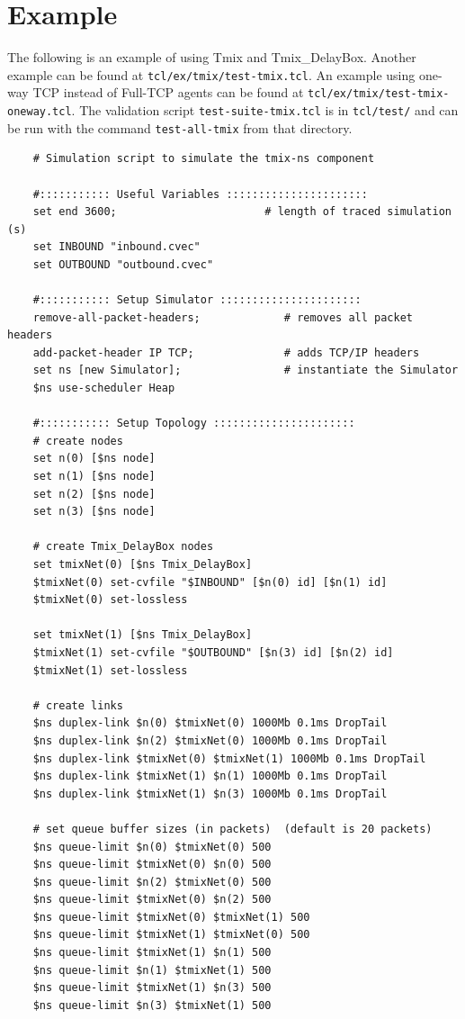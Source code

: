 \section{Example}
The following is an example of using Tmix and Tmix\_DelayBox.  Another example can be found at {\tt tcl/ex/tmix/test-tmix.tcl}.  An example using one-way TCP instead of Full-TCP agents can be found at {\tt tcl/ex/tmix/test-tmix-oneway.tcl}.  The
validation script {\tt test-suite-tmix.tcl} is in {\tt tcl/test/} and
can be run with the command {\tt test-all-tmix} from that directory.

\begin{verbatim}
	# Simulation script to simulate the tmix-ns component

	#::::::::::: Useful Variables ::::::::::::::::::::::
	set end 3600;                       # length of traced simulation (s)
	set INBOUND "inbound.cvec"
	set OUTBOUND "outbound.cvec"

	#::::::::::: Setup Simulator ::::::::::::::::::::::
	remove-all-packet-headers;             # removes all packet headers
	add-packet-header IP TCP;              # adds TCP/IP headers
	set ns [new Simulator];                # instantiate the Simulator
	$ns use-scheduler Heap

	#::::::::::: Setup Topology ::::::::::::::::::::::
	# create nodes
	set n(0) [$ns node]
	set n(1) [$ns node]
	set n(2) [$ns node]
	set n(3) [$ns node]

	# create Tmix_DelayBox nodes
	set tmixNet(0) [$ns Tmix_DelayBox]
	$tmixNet(0) set-cvfile "$INBOUND" [$n(0) id] [$n(1) id]
	$tmixNet(0) set-lossless

	set tmixNet(1) [$ns Tmix_DelayBox]
	$tmixNet(1) set-cvfile "$OUTBOUND" [$n(3) id] [$n(2) id]
	$tmixNet(1) set-lossless

	# create links
	$ns duplex-link $n(0) $tmixNet(0) 1000Mb 0.1ms DropTail
	$ns duplex-link $n(2) $tmixNet(0) 1000Mb 0.1ms DropTail
	$ns duplex-link $tmixNet(0) $tmixNet(1) 1000Mb 0.1ms DropTail
	$ns duplex-link $tmixNet(1) $n(1) 1000Mb 0.1ms DropTail
	$ns duplex-link $tmixNet(1) $n(3) 1000Mb 0.1ms DropTail

	# set queue buffer sizes (in packets)  (default is 20 packets)
	$ns queue-limit $n(0) $tmixNet(0) 500
	$ns queue-limit $tmixNet(0) $n(0) 500
	$ns queue-limit $n(2) $tmixNet(0) 500
	$ns queue-limit $tmixNet(0) $n(2) 500
	$ns queue-limit $tmixNet(0) $tmixNet(1) 500
	$ns queue-limit $tmixNet(1) $tmixNet(0) 500
	$ns queue-limit $tmixNet(1) $n(1) 500
	$ns queue-limit $n(1) $tmixNet(1) 500
	$ns queue-limit $tmixNet(1) $n(3) 500
	$ns queue-limit $n(3) $tmixNet(1) 500
	

\end{verbatim}
